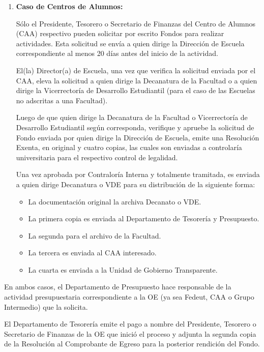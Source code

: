 \begin{enumerate}[label=\textbf{\Alph*.}]
    \item \textbf{Caso de Centros de Alumnos:}

    Sólo el Presidente, Tesorero o Secretario de Finanzas del Centro de Alumnos (CAA) respectivo pueden solicitar por escrito Fondos para realizar actividades. Esta solicitud se envía a quien dirige la Dirección de Escuela correspondiente al menos 20 días antes del inicio de la actividad. 

    El(la) Director(a) de Escuela, una vez que verifica la solicitud enviada por el CAA, eleva la solicitud a quien dirige la Decanatura de la Facultad o a quien dirige la Vicerrectoría de Desarrollo Estudiantil (para el caso de las Escuelas no adscritas a una Facultad).

    Luego de que quien dirige la Decanatura de la Facultad o Vicerrectoría de Desarrollo Estudiantil según corresponda, verifique y apruebe la solicitud de Fondo enviada por quien dirige la Dirección de Escuela, emite una Resolución Exenta, en original y cuatro copias, las cuales son enviadas a controlaría universitaria para el respectivo control de legalidad.

    Una vez aprobada por Contraloría Interna y totalmente tramitada, es enviada a quien dirige Decanatura o VDE para su distribución de la siguiente forma: 
    \begin{itemize}
        \item La documentación original la archiva Decanato o VDE.
        \item La primera copia es enviada al Departamento de Tesorería y Presupuesto.
        \item La segunda para el archivo de la Facultad.
        \item La tercera es enviada al CAA interesado.
        \item La cuarta es enviada a la Unidad de Gobierno Transparente.
    \end{itemize}

\end{enumerate}

En ambos casos, el Departamento de Presupuesto hace responsable de la actividad presupuestaria correspondiente a la OE (ya sea Fedeut, CAA o Grupo Intermedio) que la solicita.

El Departamento de Tesorería emite el pago a nombre del Presidente, Tesorero o Secretario de Finanzas de la OE que inició el proceso y adjunta la segunda copia de la Resolución al Comprobante de Egreso para la posterior rendición del Fondo.

